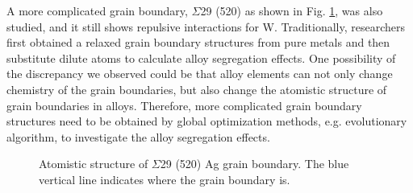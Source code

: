 A more complicated grain boundary, $\Sigma$29 (520) as shown in Fig. \ref{Chap:Ag/ZnO:fig20}, was also studied, and it still shows repulsive interactions for W. Traditionally, researchers first obtained a relaxed grain boundary structures from pure metals and then substitute dilute atoms to calculate alloy segregation effects. One possibility of the discrepancy we observed could be that alloy elements can not only change chemistry of the grain boundaries, but also change the atomistic structure of grain boundaries in alloys. Therefore, more complicated grain boundary structures need to be obtained by global optimization methods, e.g. evolutionary algorithm, to investigate the alloy segregation effects.


\begingroup
\begin{figure}[!ht]
  \centering
  \caption[Atomistic structure of $\Sigma$29 (520) Ag grain boundary.]{Atomistic structure of $\Sigma$29 (520) Ag grain boundary. The blue vertical line indicates where the grain boundary is.}
  \label{Chap:Ag/ZnO:fig20}
\end{figure}
\endgroup